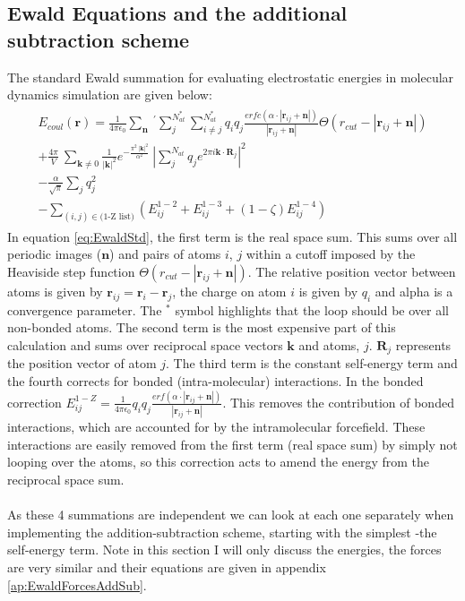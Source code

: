 \subsection{Ewald Equations and the additional subtraction scheme}
The standard Ewald summation for evaluating electrostatic energies in molecular dynamics simulation are given below:
\begin{align}
  \begin{split}
E_{coul}\left(\mathbf{r}\right)
=
	  \frac{1}{4 \pi \epsilon_0} \sum_{\mathbf{n}} \ ^{'} \sum_{j}^{N_{at}^{*}} \sum_{i \neq j}^{N_{at}^{*}} q_i q_j \frac{erfc\left( \alpha \cdot |\mathbf{r}_{ij} + \mathbf{n}|\right)}{|\mathbf{r}_{ij} + \mathbf{n}|} \Theta\left( r_{cut} - |\mathbf{r}_{ij} + \mathbf{n}| \right)
\\
+
\frac{4 \pi}{ V} \ \sum_{\mathbf{k} \neq 0} \frac{1}{|\mathbf{k}|^2} e^{-\frac{\pi^2 \ |\mathbf{k}|^2}{\alpha^2}} \ \left|\sum_{j}^{N_{at}} q_{j} e^{2\pi i \mathbf{k} \cdot \mathbf{R}_{j}}\right|^2 \\
- \frac{\alpha}{\sqrt{\pi}} \sum_{j} q_{j}^2
\\
	  - \sum_{(i,j) \in (\text{1-Z list)}}\left(E^{1-2}_{ij} + E^{1-3}_{ij} + (1 - \zeta)E_{ij}^{1-4} \right)
	\end{split}
\label{eq:EwaldStd}
\end{align}
In equation \eqref{eq:EwaldStd}, the first term is the real space sum. This sums over all periodic images ($\mathbf{n}$) and pairs of atoms $i$, $j$ within a cutoff imposed by the Heaviside step function $\Theta(r_{cut} - |\mathbf{r}_{ij}+\mathbf{n}|)$. The relative position vector between atoms is given by $\mathbf{r}_{ij} = \mathbf{r}_{i} - \mathbf{r}_{j}$, the charge on atom $i$ is given by $q_{i}$ and alpha is a convergence parameter. The $^{*}$ symbol highlights that the loop should be over all non-bonded atoms. The second term is the most expensive part of this calculation and sums over reciprocal space vectors $\mathbf{k}$ and atoms, $j$. $\mathbf{R}_{j}$ represents the position vector of atom $j$. The third term is the constant self-energy term and the fourth corrects for bonded (intra-molecular) interactions. In the bonded correction $E_{ij}^{1-Z} = \frac{1}{4 \pi \epsilon_{0}} q_{i}q_{j} \frac{erf\left( \alpha \cdot |\mathbf{r}_{ij} + \mathbf{n}|\right)}{|\mathbf{r}_{ij} + \mathbf{n}|}$. This removes the contribution of bonded interactions, which are accounted for by the intramolecular forcefield. These interactions are easily removed from the first term (real space sum) by simply not looping over the atoms, so this correction acts to amend the energy from the reciprocal space sum.
\\\\
As these 4 summations are independent we can look at each one separately when implementing the addition-subtraction scheme, starting with the simplest -the self-energy term. Note in this section I will only discuss the energies, the forces are very similar and their equations are given in appendix \ref{ap:EwaldForcesAddSub}.
